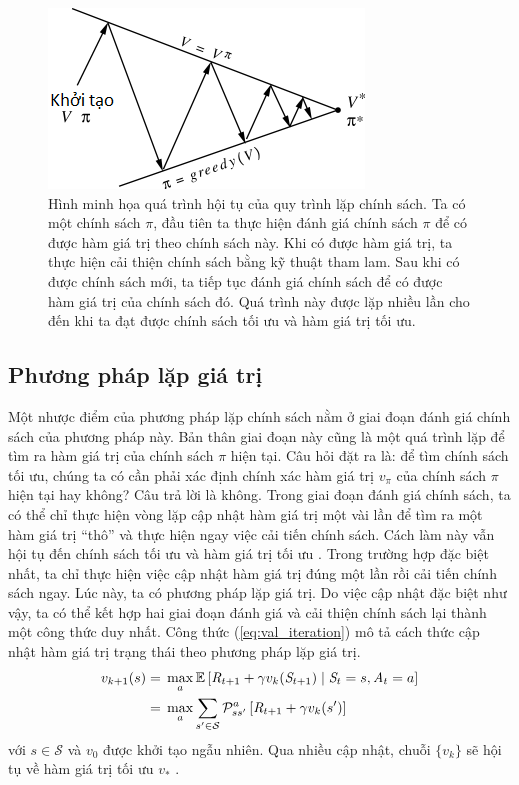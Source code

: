 \begin{figure}
	\centering
	\includegraphics[width=.8\textwidth]{policy_iteration}
	\caption[Hội tụ của quy trình tìm kiếm chính sách tối ưu]{Hình minh họa quá trình hội tụ của quy trình lặp chính sách.
	Ta có một chính sách $\pi$, đầu tiên ta thực hiện đánh giá chính sách $\pi$ để có được hàm giá trị theo chính sách này. 
	Khi có được hàm giá trị, ta thực hiện cải thiện chính sách bằng kỹ thuật tham lam. 
	Sau khi có được chính sách mới, ta tiếp tục đánh giá chính sách để có được hàm giá trị của chính sách đó. 
	Quá trình này được lặp nhiều lần cho đến khi ta đạt được chính sách tối ưu và hàm giá trị tối ưu.}
	\label{fig:policy_iteration_MDP}	
\end{figure}

\subsection{Phương pháp lặp giá trị}
Một nhược điểm của phương pháp lặp chính sách nằm ở giai đoạn đánh giá chính sách của phương pháp này. 
Bản thân giai đoạn này cũng là một quá trình lặp để tìm ra hàm giá trị của chính sách $\pi$ hiện tại. 
Câu hỏi đặt ra là: để tìm chính sách tối ưu, chúng ta có cần phải xác định chính xác hàm giá trị $v_{\pi}$ của chính sách $\pi$ hiện tại hay không? 
Câu trả lời là không.
Trong giai đoạn đánh giá chính sách, ta có thể chỉ thực hiện vòng lặp cập nhật hàm giá trị một vài lần để tìm ra một hàm giá trị ``thô'' và thực hiện ngay việc cải tiến chính sách.
Cách làm này vẫn hội tụ đến chính sách tối ưu và hàm giá trị tối ưu \cite{sutton1998introduction}.
Trong trường hợp đặc biệt nhất, ta chỉ thực hiện việc cập nhật hàm giá trị đúng một lần rồi cải tiến chính sách ngay.
Lúc này, ta có phương pháp lặp giá trị.
Do việc cập nhật đặc biệt như vậy, ta có thể kết hợp hai giai đoạn đánh giá và cải thiện chính sách lại thành một công thức duy nhất.
Công thức (\ref{eq:val_iteration}) mô tả cách thức cập nhật hàm giá trị trạng thái theo phương pháp lặp giá trị.
\begin{align}
	v_{k+1}(s) = {} & \max_{a}\mathbb{E}\left[\mathit{R}_{t+1} + \gamma v_{k}(\mathit{S}_{t+1}) \mid \mathit{S}_{t} = s, \mathit{A}_t = a\right] \notag \\
	= {} & \max_{a}\sum_{s' \in \mathcal{S}}\mathcal{P}_{ss'}^{a}\left[\mathit{R}_{t+1} + \gamma v_{k}(s')\right] \label{eq:val_iteration}
\end{align}
với $s \in \mathcal{S}$ và $v_{0}$ được khởi tạo ngẫu nhiên. 
Qua nhiều cập nhật, chuỗi $\{v_{k}\}$ sẽ hội tụ về hàm giá trị tối ưu $v_*$ \cite{sutton1998introduction}.


